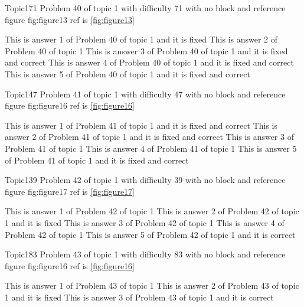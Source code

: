 \documentclass[master]{exam}
\begin{document}
\begin{problem}{Topic1}{71}
	Problem 40 of topic 1 with difficulty 71 with no block and reference figure fig:figure13 ref is \ref{fig:figure13}
	\begin{answers}
		\answer[fixed] This is answer 1 of Problem 40 of topic 1 and it is fixed
		\answer This is answer 2 of Problem 40 of topic 1 
		 This is answer 3 of Problem 40 of topic 1 and it is fixed and correct
		 This is answer 4 of Problem 40 of topic 1 and it is fixed and correct
		 This is answer 5 of Problem 40 of topic 1 and it is fixed and correct
	\end{answers}
\end{problem}

\begin{problem}{Topic1}{47}
	Problem 41 of topic 1 with difficulty 47 with no block and reference figure fig:figure16 ref is \ref{fig:figure16}
	\begin{answers}
		 This is answer 1 of Problem 41 of topic 1 and it is fixed and correct
		 This is answer 2 of Problem 41 of topic 1 and it is fixed and correct
		\answer This is answer 3 of Problem 41 of topic 1 
		\answer This is answer 4 of Problem 41 of topic 1 
		 This is answer 5 of Problem 41 of topic 1 and it is fixed and correct
	\end{answers}
\end{problem}

\begin{problem}{Topic1}{39}
	Problem 42 of topic 1 with difficulty 39 with no block and reference figure fig:figure17 ref is \ref{fig:figure17}
	\begin{answers}
		\answer This is answer 1 of Problem 42 of topic 1 
		\answer[fixed] This is answer 2 of Problem 42 of topic 1 and it is fixed
		\answer This is answer 3 of Problem 42 of topic 1 
		\answer This is answer 4 of Problem 42 of topic 1 
		\answer[correct] This is answer 5 of Problem 42 of topic 1 and it is correct
	\end{answers}
\end{problem}

\begin{problem}{Topic1}{83}
	Problem 43 of topic 1 with difficulty 83 with no block and reference figure fig:figure16 ref is \ref{fig:figure16}
	\begin{answers}
		\answer This is answer 1 of Problem 43 of topic 1 
		\answer[fixed] This is answer 2 of Problem 43 of topic 1 and it is fixed
		\answer[correct] This is answer 3 of Problem 43 of topic 1 and it is correct
	\end{answers}
\end{problem}
\end{document}
